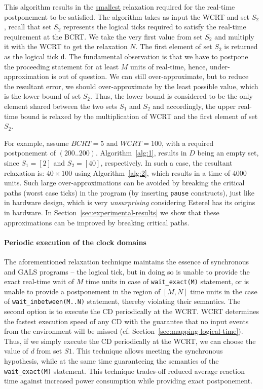 This algorithm results in the \underline{smallest} relaxation required
for the real-time postponement to be satisfied. The algorithm takes as
input the WCRT and set $S_2$, recall that set $S_2$ represents the
logical ticks required to satisfy the real-time requirement at the
BCRT. We take the very first value from set $S_2$ and multiply it with
the WCRT to get the relaxation $N$. The first element of set $S_2$ is
returned as the logical tick \texttt{d}. The fundamental observation is
that we have to postpone the proceeding statement for at least $M$ units
of real-time, hence, under-approximation is out of question. We can
still over-approximate, but to reduce the resultant error, we should
over-approximate by the least possible value, which is the lower bound
of set $S_2$. Thus, the lower bound is considered to be the only element
shared between the two sets $S_1$ and $S_2$ and accordingly, the upper
real-time bound is relaxed by the multiplication of WCRT and the first
element of set $S_2$.

For example, assume $BCRT=5$ and $WCRT=100$, with a required
postponement of $(200..200)$. Algorithm~\ref{alg:1}, results in $D$
being an empty set, since $S_1=[2]$ and $S_2=[40]$, respectively. In
such a case, the resultant relaxation is: $40 \times 100$ using
Algorithm~\ref{alg:2}, which results in a time of $4000$ units. Such
large over-approximations can be avoided by breaking the critical paths
(worst case ticks) in the program (by inserting \texttt{pause}
constructs), just like in hardware design, which is very
\textit{unsurprising} considering Esterel has its origins in hardware.
In Section~\ref{sec:experimental-results} we show that these
approximations can be improved by breaking critical paths.


\paragraph{Periodic execution of the clock domains}
\label{sec:peri-exec-clock}

The aforementioned relaxation technique maintains the essence of
synchronous and GALS programs -- the logical tick, but in doing so is
unable to provide the exact real-time wait of $M$ time units in case of
\texttt{wait\_exact(M)} statement, or is unable to provide a
postponement in the region of $[M, N]$ time units in the case of
\texttt{wait\_inbe\-tween(M..N)} statement, thereby violating their
semantics. The second option is to execute the CD periodically at the
WCRT. WCRT determines the fastest execution speed of any CD with the
guarantee that no input events from the environment will be missed (cf.
Section~\ref{sec:mapping-logical-time}). Thus, if we simply execute the
CD periodically at the WCRT, we can choose the value of \textit{d} from
set $S1$. This technique allows meeting the synchronous hypothesis,
while at the same time guaranteeing the semantics of the
\texttt{wait\_exact(M)} statement. This technique trades-off reduced
average reaction time against increased power consumption while
providing exact postponement.

